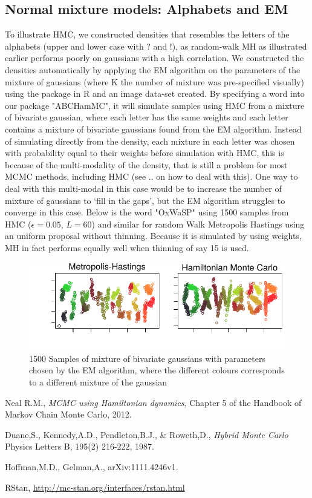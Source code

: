 \documentclass[11pt]{article}
\begin{document}
\subsection{Normal mixture models: Alphabets and EM}
To illustrate HMC, we constructed densities that resembles the letters of the alphabets (upper and lower case with ? and !), as random-walk MH as illustrated earlier performs poorly on gaussians with a high correlation. We constructed the densities automatically by applying the EM algorithm on the parameters of the mixture of gaussians (where K the number of mixture was pre-specified visually) using the package in R and an image data-set created. By specifying a word into our package "ABCHamMC", it will simulate samples using HMC from a mixture of bivariate gaussian, where each letter has the same weights and each letter contains a mixture of bivariate gaussians found from the EM algorithm. Instead of simulating directly from the density, each mixture in each letter was chosen with probability equal to their weights before simulation with HMC, this is because of the multi-modality of the density, that is still a problem for most MCMC methods, including HMC (see .. on how to deal with this). One way to deal with this multi-modal in this case would be to increase the number of mixture of gaussians to `fill in the gaps', but the EM algorithm struggles to converge in this case. Below is the word "OxWaSP" using 1500 samples from HMC ($\epsilon=0.05$, $L=60$) and similar for random Walk Metropolis Hastings using an uniform proposal without thinning. Because it is simulated by using weights, MH in fact performs equally well when thinning of say 15 is used.
\begin{figure}[H]
\center
  \includegraphics[width=5in]{images/oxwasp.pdf}
  \caption{1500 Samples of mixture of bivariate gaussians with parameters chosen by the EM algorithm, where the different colours corresponds to a different mixture of the gaussian}
\end{figure}
\begin{thebibliography}{9}

  Neal R.M.,
  \emph{MCMC using Hamiltonian dynamics},
  Chapter 5 of the Handbook of Markov Chain Monte Carlo,
  2012.
  
  Duane,S., Kennedy,A.D., Pendleton,B.J., \& Roweth,D.,
  \emph{Hybrid Monte Carlo }
  Physics Letters B, 195(2) 216-222, 1987.

  Hoffman,M.D., Gelman,A.,
  arXiv:1111.4246v1.
  
  RStan, \url{http://mc-stan.org/interfaces/rstan.html}

\end{thebibliography}
\end{document}
